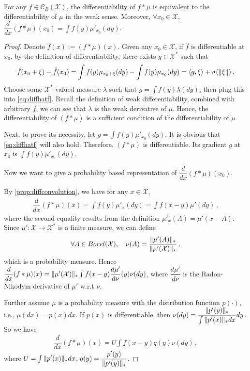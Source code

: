 \documentclass[11pt,letterpaper,english]{article}
\begin{document}
\begin{proposition}
\label{prop:diffconvolution}
For any $f \in \mathcal{C}_B(\mathcal{X})$, the differentiability of $f*\mu$ is equivalent to the differentiability of $\mu$ in the weak sense.
Moreover, $\forall x_0\in \mathcal{X}$, 
$\dfrac{d}{dx} (f*\mu) (x_0) = \int f(y)\mu'_{x_0}(dy)$.
\end{proposition}
\begin{proof}
Denote $\hat{f}(x) := (f*\mu)(x)$. Given any $x_0\in \mathcal{X}$, if $\hat{f}$ is differentiable at $x_0$, by the definition of differentiability, there exists $g \in \mathcal{X}^*$ such that
\begin{align}
\label{eq:diffhatf}
\hat{f}(x_0+\xi) - \hat{f}(x_0) 
= \int f(y)\mu_{x_0+\xi}(dy) - \int f(y)\mu_{x_0}(dy)
= \langle g, \xi \rangle+\sigma(\|\xi\|) \,.
\end{align}
Choose some $\mathcal{X}^*$-valued measure $\lambda$ such that 
$g = \int f(y)\lambda(dy)$, then plug this into \eqref{eq:diffhatf}. Recall the definition of weak differentiability, combined with arbitrary $f$, we can see that $\lambda$ is the weak derivative of $\mu$. Hence, the differentiability of $(f*\mu)$ is a sufficient condition of the differentiability of $\mu$. 

Next, to prove its necessity, let $g=\int f(y)\mu'_{x_0}(dy)$. It is obvious that \eqref{eq:diffhatf} will also hold. Therefore, $(f*\mu)$ is differentiable. Its gradient $g$ at $x_0$ is $\int f(y)\mu'_{x_0}(dy)$.

Now we want to give a probability based representation of $\dfrac{d}{dx} (f*\mu) (x_0)$.

By \cref{prop:diffconvolution}, we have for any $x\in \mathcal{X}$,
\begin{align*}
\dfrac{d}{dx} (f*\mu) (x) = \int f(y)\mu'_{x}(dy)
= \int f(x-y)\mu'(dy) \,,
\end{align*}
where the second equality results from the definition $\mu'_{x}(A)=\mu'(x-A)$. Since $\mu':\mathcal{X}\to \mathcal{X}^*$ is a finite measure, we can define 
\begin{align*}
\forall A \in Borel(\mathcal{X}), \quad
\nu(A) = \dfrac{\|\mu'(A)\|_*}{\|\mu'(\mathcal{X})\|_*}\,,
\end{align*}
which is a probability measure. Hence 
$\dfrac{d}{dx} (f*\mu) (x) = \|\mu'(\mathcal{X})\|_* \int f(x-y) \dfrac{d\mu'}{d\nu}(y) \nu(dy)$, where $\dfrac{d\mu'}{d\nu}$ is the Radon-Nikodym derivative of $\mu'$ w.r.t $\nu$.

Further assume $\mu$ is a probability measure with the distribution function $p(\cdot)$, i.e., $\mu(dx) = p(x)dx$. If $p(x)$ is differentiable, then
$\nu(dy) = \dfrac{\|p'(y)\|_*}{\int \|p'(x)\|_*dx}dy$.
So we have
\begin{align*}
\dfrac{d}{dx} (f*\mu) (x) = U \int f(x-y) q(y) \nu (dy)\,,
\end{align*}
where $U = \int \|p'(x)\|_*dx$, $q(y) = \dfrac{p'(y)}{\|p'(y)\|_*}$.



\end{proof}
\end{document}
